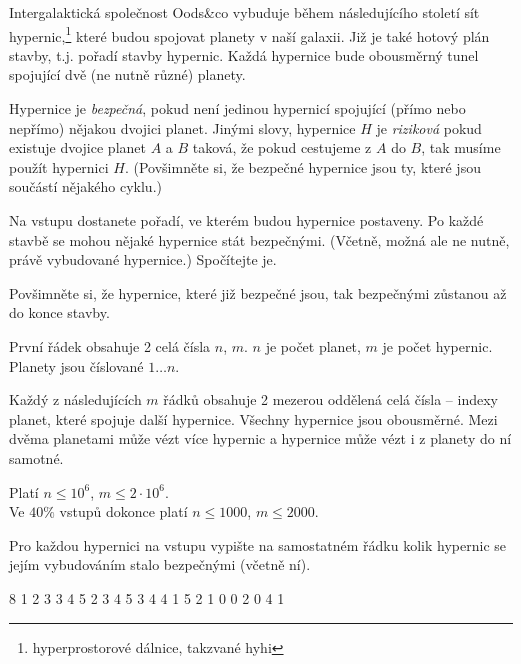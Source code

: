 





Intergalaktická společnost Oods\&co vybuduje
během následujícího století sít hypernic,\footnote{hyperprostorové dálnice, takzvané hyhi}
které budou spojovat planety v naší galaxii.
Již je také hotový plán stavby, t.j. pořadí stavby hypernic.
Každá hypernice bude obousměrný tunel spojující dvě (ne nutně různé) planety.


Hypernice je \emph{bezpečná}, pokud není jedinou hypernicí spojující (přímo nebo nepřímo) nějakou dvojici planet.
Jinými slovy, hypernice $H$ je \emph{riziková} pokud existuje dvojice planet $A$ a $B$ taková, že
pokud cestujeme z $A$ do $B$, tak musíme použít hypernici $H$.
(Povšimněte si, že bezpečné hypernice jsou ty, které jsou součástí nějakého cyklu.)

Na vstupu dostanete pořadí, ve kterém budou hypernice postaveny.
Po každé stavbě se mohou nějaké hypernice stát bezpečnými.
(Včetně, možná ale ne nutně, právě vybudované hypernice.)
Spočítejte je.

Povšimněte si, že hypernice, které již bezpečné jsou, tak bezpečnými zůstanou až do konce stavby.


První řádek obsahuje 2 celá čísla $n$, $m$.
$n$ je počet planet,
$m$ je počet hypernic.
Planety jsou číslované $1 \dots n$.

Každý z následujících $m$ řádků obsahuje 2
mezerou oddělená celá čísla --
indexy planet, které spojuje další hypernice.
Všechny hypernice jsou obousměrné.
Mezi dvěma planetami může vézt více hypernic
a hypernice může vézt i z planety do ní samotné.

\bigskip

\noindent
Platí $n \leq 10^6$, $m \leq 2\cdot10^6$.\\
Ve $40\%$ vstupů dokonce platí
$n \leq 1000$, $m \leq 2000$.


Pro každou hypernici na vstupu vypište na samostatném řádku
kolik hypernic se jejím vybudováním stalo bezpečnými (včetně ní).



 8
1 2
3 3
4 5
2 3
4 5
3 4
4 1
5 2
1
0
0
2
0
4
1
\sampleEND



